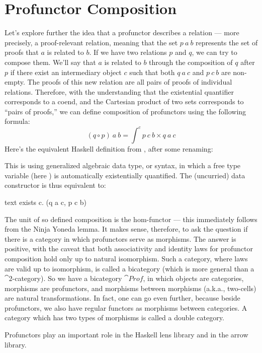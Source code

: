 \section{Profunctor Composition}

Let's explore further the idea that a profunctor describes a relation
--- more precisely, a proof-relevant relation, meaning that the set
$p\ a\ b$ represents the set of proofs that $a$ is related
to $b$. If we have two relations $p$ and $q$, we can
try to compose them. We'll say that $a$ is related to $b$
through the composition of $q$ after $p$ if there exist an
intermediary object $c$ such that both $q\ a\ c$ and
$p\ c\ b$ are non-empty. The proofs of this new relation are all
pairs of proofs of individual relations. Therefore, with the
understanding that the existential quantifier corresponds to a coend,
and the Cartesian product of two sets corresponds to ``pairs of
proofs,'' we can define composition of profunctors using the following
formula:
\[(q \circ p)\ a\ b = \int^c p\ c\ b\times{}q\ a\ c\]
Here's the equivalent Haskell definition from
, after some renaming:

This is using generalized algebraic data type, or  syntax, in which
a free type variable (here ) is automatically existentially
quantified. The (uncurried) data constructor  is
thus equivalent to:

\begin{snip}{text}
exists c. (q a c, p c b)
\end{snip}
The unit of so defined composition is the hom-functor --- this
immediately follows from the Ninja Yoneda lemma. It makes sense,
therefore, to ask the question if there is a category in which
profunctors serve as morphisms. The answer is positive, with the caveat
that both associativity and identity laws for profunctor composition
hold only up to natural isomorphism. Such a category, where laws are
valid up to isomorphism, is called a bicategory (which is more general
than a $\cat{2}$-category). So we have a bicategory $\cat{Prof}$, in which
objects are categories, morphisms are profunctors, and morphisms between
morphisms (a.k.a., two-cells) are natural transformations. In fact, one
can go even further, because beside profunctors, we also have regular
functors as morphisms between categories. A category which has two types
of morphisms is called a double category.

Profunctors play an important role in the Haskell lens library and in
the arrow library.
